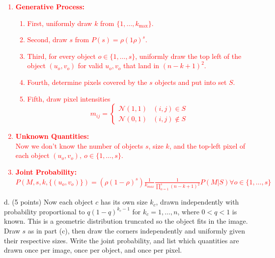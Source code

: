\documentclass[11pt]{article}
\begin{document}
\textcolor{red}{
\begin{enumerate}
    \item \textbf{Generative Process:}\\
        \begin{enumerate}
            \item 
                First, uniformly draw $k$ from $\{1,\ldots,k_{\max}\}$.
            \item 
                Second, draw $s$ from $P(s)=\rho(1 \rho)^s$.
            \item 
                Third, for every object $o \in \{1,\ldots,s\}$, uniformly draw the top left of the object $(u_o,v_o)$ for valid $u_o,v_o$ that land in $(n-k+1)^2$.
            \item 
                Fourth, determine pixels covered by the $s$ objects and put into set $S$.
            \item 
                Fifth, draw pixel intensities
                \[
                m_{ij} = 
                \begin{cases} 
                      \mathcal N(1,1) & (i,j) \in S \\
                      \mathcal N(0,1) & (i,j) \notin S 
                \end{cases}
                \]
        \end{enumerate}
    \item \textbf{Unknown Quantities:}\\
        Now we don't know the number of objects $s$, size $k$, and the top-left pixel of each object $(u_o,v_o),\ o \in \{1,\ldots,s\}$.
    \item \textbf{Joint Probability:}\\
        $P(M, s, k, \{(u_o, v_o)\}) = (\rho(1-\rho)^s)\frac{1}{k_{max}} \frac{1}{\prod_{o=1}^{s}(n-k+1)^2} P(M|S) \forall o \in \{1,\ldots,s\}$
\end{enumerate}
}

d. (5 points) Now each object $c$ has its own size $k_c$, drawn
independently with probability proportional to $q(1-q)^{k_c-1}$ for $k_c=1,\ldots,n$, where $0<q<1$ is known.  This is a geometric distribution truncated so the object fits in the image.  Draw $s$ as in part (c), then draw the corners independently and uniformly given their respective sizes. Write the joint probability, and list which quantities are drawn once per image, once per object, and once per pixel.
\end{document}
